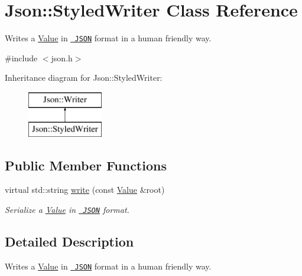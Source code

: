 \hypertarget{class_json_1_1_styled_writer}{}\section{Json\+::Styled\+Writer Class Reference}
\label{class_json_1_1_styled_writer}


Writes a \mbox{\hyperlink{class_json_1_1_value}{Value}} in \href{http://www.json.org}{\texttt{ J\+S\+ON}} format in a human friendly way.  




{\ttfamily \#include $<$json.\+h$>$}

Inheritance diagram for Json\+::Styled\+Writer\+:\begin{figure}[H]
\begin{center}
\leavevmode
\includegraphics[height=2.000000cm]{class_json_1_1_styled_writer}
\end{center}
\end{figure}
\subsection*{Public Member Functions}
\begin{DoxyCompactItemize}
\item 
virtual std\+::string \mbox{\hyperlink{class_json_1_1_styled_writer_a35036ba0842bc65500274c9ec30708d1}{write}} (const \mbox{\hyperlink{class_json_1_1_value}{Value}} \&root)
\begin{DoxyCompactList}\small\item\em Serialize a \mbox{\hyperlink{class_json_1_1_value}{Value}} in \href{http://www.json.org}{\texttt{ J\+S\+ON}} format. \end{DoxyCompactList}\end{DoxyCompactItemize}


\subsection{Detailed Description}
Writes a \mbox{\hyperlink{class_json_1_1_value}{Value}} in \href{http://www.json.org}{\texttt{ J\+S\+ON}} format in a human friendly way. 

